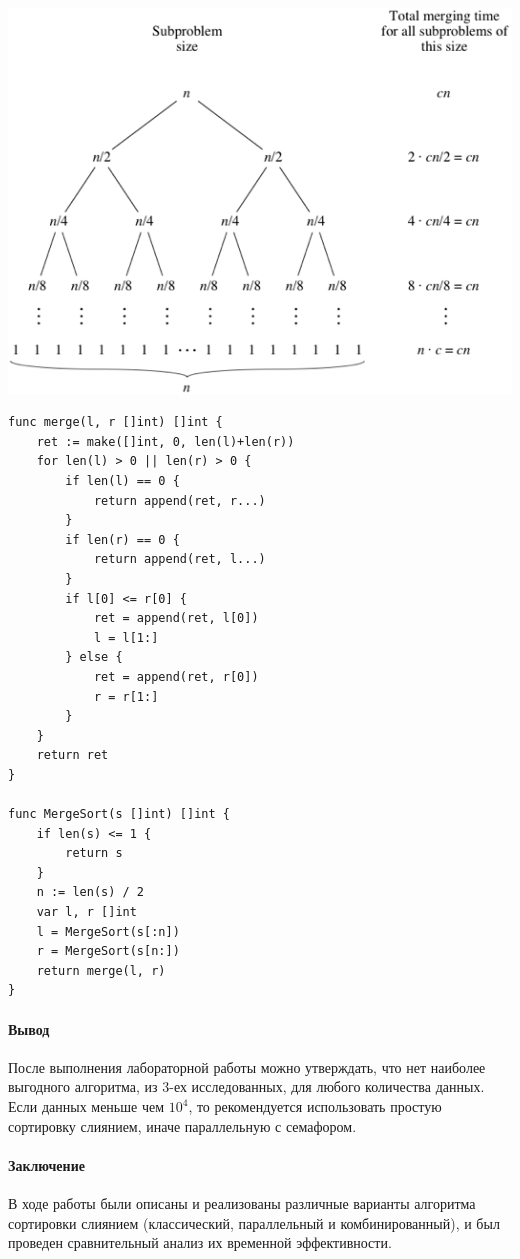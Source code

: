 \documentclass[utf8x, 12pt]{G7-32} %
\begin{document}
\begin{center}
	\includegraphics{images/mergeSortTree.png}
\end{center}

\begin{lstlisting}
func merge(l, r []int) []int {
	ret := make([]int, 0, len(l)+len(r))
	for len(l) > 0 || len(r) > 0 {
		if len(l) == 0 {
			return append(ret, r...)
		}
		if len(r) == 0 {
			return append(ret, l...)
		}
		if l[0] <= r[0] {
			ret = append(ret, l[0])
			l = l[1:]
		} else {
			ret = append(ret, r[0])
			r = r[1:]
		}
	}
	return ret
}

func MergeSort(s []int) []int {
	if len(s) <= 1 {
		return s
	}
	n := len(s) / 2
	var l, r []int
	l = MergeSort(s[:n])
	r = MergeSort(s[n:])
	return merge(l, r)
}
\end{lstlisting}

\paragraph{Вывод}

После выполнения лабораторной работы можно утверждать, что нет наиболее выгодного алгоритма, из 3-ех исследованных, для любого количества данных. Если данных меньше чем $10^4$, то рекомендуется использовать простую сортировку слиянием, иначе параллельную с семафором.

\paragraph{Заключение}

В ходе работы были описаны и реализованы различные варианты алгоритма сортировки слиянием (классический, параллельный и комбинированный), и был проведен сравнительный анализ их временной эффективности.

\backmatter %

\appendix   %
\end{document}
